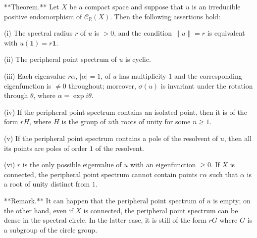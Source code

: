 **Theorem.** Let $X$ be a compact space and suppose that $u$ is an irreducible positive endomorphism of $\mathcal{C}_{\mathbb{R}}(X)$. Then the following assertions hold:

(i) The spectral radius $r$ of $u$ is $> 0$, and the condition $\|u\| = r$ is equivalent with $u(\mathbf{1}) = r \mathbf{1}$.

(ii) The peripheral point spectrum of $u$ is cyclic.

(iii) Each eigenvalue $r\alpha$, $|\alpha| = 1$, of $u$ has multiplicity $1$ and the corresponding eigenfunction is $\neq 0$ throughout; moreover, $\sigma(u)$ is invariant under the rotation through $\theta$, where $\alpha = \exp i\theta$.

(iv) If the peripheral point spectrum contains an isolated point, then it is of the form $rH$, where $H$ is the group of $n$th roots of unity for some $n \geq 1$.

(v) If the peripheral point spectrum contains a pole of the resolvent of $u$, then all its points are poles of order $1$ of the resolvent.

(vi) $r$ is the only possible eigenvalue of $u$ with an eigenfunction $\geq 0$. If $X$ is connected, the peripheral point spectrum cannot contain points $r\alpha$ such that $\alpha$ is a root of unity distinct from $1$.

**Remark.** It can happen that the peripheral point spectrum of $u$ is empty; on the other hand, even if $X$ is connected, the peripheral point spectrum can be dense in the spectral circle. In the latter case, it is still of the form $rG$ where $G$ is a subgroup of the circle group.
